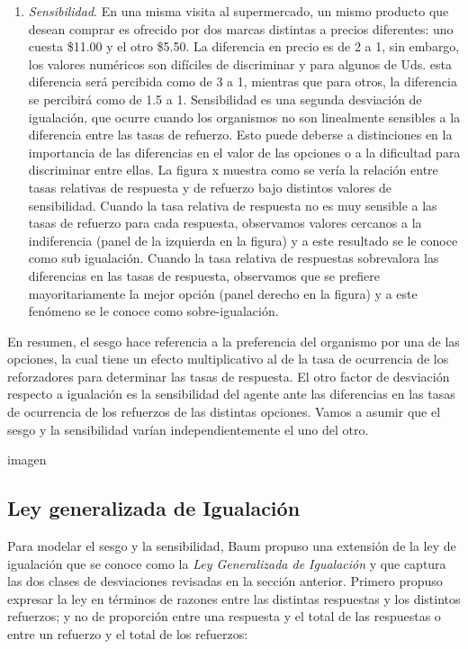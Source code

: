 \documentclass[
  letterpaper,
]{book}
\providecommand{\tightlist}{%
  \setlength{\itemsep}{0pt}\setlength{\parskip}{0pt}}\usepackage{longtable,booktabs,array}
\begin{document}
\begin{enumerate}
\def\labelenumi{\arabic{enumi}.}
\setcounter{enumi}{1}
\tightlist
\item
  \emph{Sensibilidad}. En una misma visita al supermercado, un mismo
  producto que desean comprar es ofrecido por dos marcas distintas a
  precios diferentes: uno cuesta \$11.00 y el otro \$5.50. La diferencia
  en precio es de 2 a 1, sin embargo, los valores numéricos son
  difíciles de discriminar y para algunos de Uds. esta diferencia será
  percibida como de 3 a 1, mientras que para otros, la diferencia se
  percibirá como de 1.5 a 1. Sensibilidad es una segunda desviación de
  igualación, que ocurre cuando los organismos no son linealmente
  sensibles a la diferencia entre las tasas de refuerzo. Esto puede
  deberse a distinciones en la importancia de las diferencias en el
  valor de las opciones o a la dificultad para discriminar entre ellas.
  La figura x muestra como se vería la relación entre tasas relativas de
  respuesta y de refuerzo bajo distintos valores de sensibilidad. Cuando
  la tasa relativa de respuesta no es muy sensible a las tasas de
  refuerzo para cada respuesta, observamos valores cercanos a la
  indiferencia (panel de la izquierda en la figura) y a este resultado
  se le conoce como sub igualación. Cuando la tasa relativa de
  respuestas sobrevalora las diferencias en las tasas de respuesta,
  observamos que se prefiere mayoritariamente la mejor opción (panel
  derecho en la figura) y a este fenómeno se le conoce como
  sobre-igualación.
\end{enumerate}

En resumen, el sesgo hace referencia a la preferencia del organismo por
una de las opciones, la cual tiene un efecto multiplicativo al de la
tasa de ocurrencia de los reforzadores para determinar las tasas de
respuesta. El otro factor de desviación respecto a igualación es la
sensibilidad del agente ante las diferencias en las tasas de ocurrencia
de los refuerzos de las distintas opciones. Vamos a asumir que el sesgo
y la sensibilidad varían independientemente el uno del otro.

imagen

\subsection{Ley generalizada de
Igualación}\label{ley-generalizada-de-igualaciuxf3n}

Para modelar el sesgo y la sensibilidad, Baum propuso una extensión de
la ley de igualación que se conoce como la \emph{Ley Generalizada de
Igualación} y que captura las dos clases de desviaciones revisadas en la
sección anterior. Primero propuso expresar la ley en términos de razones
entre las distintas respuestas y los distintos refuerzos; y no de
proporción entre una respuesta y el total de las respuestas o entre un
refuerzo y el total de los refuerzos:
\end{document}
